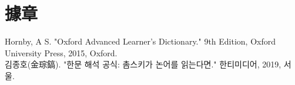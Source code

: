 \chapter{據章}
Hornby, A S. "Oxford Advanced Learner's Dictionary." 9th Edition, Oxford University Press, 2015, Oxford. \\
김종호(金琮鎬). "한문 해석 공식: 촘스키가 논어를 읽는다면." 한티미디어, 2019, 서울.
